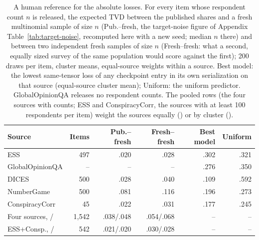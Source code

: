 \begin{table}[t]
\centering\scriptsize
\setlength{\tabcolsep}{2pt}
\begin{tabular}{@{}lrrrrr@{}}
\toprule
Source & Items & Pub.--fresh & Fresh--fresh & Best model & Uniform \\
\midrule
ESS & 497 & .020 & .028 & .302 & .321 \\
GlobalOpinionQA & -- & -- & -- & .276 & .350 \\
DICES & 500 & .028 & .040 & .109 & .592 \\
NumberGame & 500 & .081 & .116 & .196 & .273 \\
ConspiracyCorr & 45 & .022 & .031 & .177 & .245 \\
\midrule
Four sources, \ES{}/\PC{} & 1,542 & .038/.048 & .054/.068 & -- & -- \\
ESS+Consp., \ES{}/\PC{} & 542 & .021/.020 & .030/.028 & -- & -- \\
\bottomrule
\end{tabular}
\caption{A human reference for the absolute losses. For every item whose respondent count $n$ is released, the expected TVD between the published shares and a fresh multinomial sample of size $n$ (Pub.--fresh, the target-noise figure of Appendix Table~\ref{tab:target-noise}, recomputed here with a new seed; median $n$ there) and between two independent fresh samples of size $n$ (Fresh--fresh: what a second, equally sized survey of the same population would score against the first); 200 draws per item, cluster means, equal-source weights within a source. Best model: the lowest same-tensor loss of any checkpoint entry in its own serialization on that source (equal-source cluster mean); Uniform: the uniform predictor. GlobalOpinionQA releases no respondent counts. The pooled rows (the four sources with counts; ESS and ConspiracyCorr, the sources with at least 100 respondents per item) weight the sources equally (\ES{}) or by cluster (\PC{}).}
\label{tab:human-ceiling}
\end{table}
